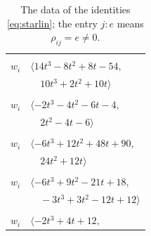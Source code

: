 \documentclass[11pt]{article}
\begin{document}
\begingroup\scriptsize
\setlength{\LTcapwidth}{\textwidth}
\begin{longtable}{@{}ll@{}}
\caption{The data of the identities \eqref{eq:starlin}; the entry $j{:}e$ means $\rho_{ij}=e\neq0$.}\label{tab:star}\\
\hline\endfirsthead\hline\endhead\hline\endfoot
\multicolumn{2}{@{}p{0.97\textwidth}@{}}{$i=0$, $D_i=1$, $\rho_{ij}$: $7{:}2, \allowbreak 8{:}2, \allowbreak 11{:}1, \allowbreak 13{:}1, \allowbreak 15{:}2, \allowbreak 16{:}1, \allowbreak 20{:}2, \allowbreak 23{:}1, \allowbreak 25{:}1, \allowbreak 29{:}1, \allowbreak 40{:}2, \allowbreak 43{:}1, \allowbreak 45{:}1$}\\
$w_i$ & $\langle 14t^{3}-8t^{2}+8t-54,$\\
 & $\quad 10t^{3}+2t^{2}+10t\rangle$\\
\addlinespace[2pt]
\multicolumn{2}{@{}p{0.97\textwidth}@{}}{$i=1$, $D_i=1$, $\rho_{ij}$: $5{:}1, \allowbreak 7{:}1, \allowbreak 11{:}1, \allowbreak 16{:}1, \allowbreak 24{:}1, \allowbreak 27{:}2, \allowbreak 28{:}1, \allowbreak 33{:}1, \allowbreak 43{:}1$}\\
$w_i$ & $\langle -2t^{3}-4t^{2}-6t-4,$\\
 & $\quad 2t^{2}-4t-6\rangle$\\
\addlinespace[2pt]
\multicolumn{2}{@{}p{0.97\textwidth}@{}}{$i=2$, $D_i=1$, $\rho_{ij}$: $8{:}2, \allowbreak 15{:}1, \allowbreak 20{:}2, \allowbreak 22{:}1, \allowbreak 24{:}2, \allowbreak 27{:}1, \allowbreak 29{:}1, \allowbreak 30{:}1, \allowbreak 33{:}2, \allowbreak 40{:}1, \allowbreak 41{:}2, \allowbreak 42{:}2, \allowbreak 43{:}1$}\\
$w_i$ & $\langle -6t^{3}+12t^{2}+48t+90,$\\
 & $\quad 24t^{2}+12t\rangle$\\
\addlinespace[2pt]
\multicolumn{2}{@{}p{0.97\textwidth}@{}}{$i=3$, $D_i=1$, $\rho_{ij}$: $7{:}2, \allowbreak 14{:}2, \allowbreak 15{:}1, \allowbreak 29{:}1, \allowbreak 30{:}1, \allowbreak 36{:}1, \allowbreak 39{:}2, \allowbreak 40{:}1, \allowbreak 41{:}2, \allowbreak 44{:}1$}\\
$w_i$ & $\langle -6t^{3}+9t^{2}-21t+18,$\\
 & $\quad -3t^{3}+3t^{2}-12t+12\rangle$\\
\addlinespace[2pt]
\multicolumn{2}{@{}p{0.97\textwidth}@{}}{$i=4$, $D_i=1$, $\rho_{ij}$: $7{:}2, \allowbreak 10{:}1, \allowbreak 11{:}1, \allowbreak 14{:}2, \allowbreak 27{:}2, \allowbreak 35{:}2, \allowbreak 41{:}1$}\\
$w_i$ & $\langle -2t^{3}+4t+12,$\\

\end{longtable}
\end{document}
